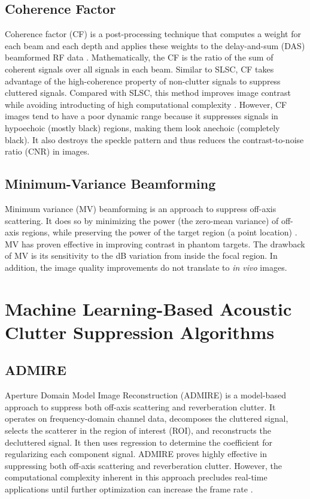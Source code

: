     \subsection{Coherence Factor}
      Coherence factor (CF) is a post-processing technique that computes a weight for each beam and each depth and applies these weights to the delay-and-sum (DAS) beamformed RF data \cite{mallart1994adaptive, hollman1999coherence}. Mathematically, the CF is the ratio of the sum of coherent signals over all signals in each beam. Similar to SLSC, CF takes advantage of the high-coherence property of non-clutter signals to suppress cluttered signals. Compared with SLSC, this method improves image contrast while avoiding introducting of high computational complexity \cite{dei_thesis}. However, CF images tend to have a poor dynamic range because it suppresses signals in hypoechoic (mostly black) regions, making them look anechoic (completely black). It also destroys the speckle pattern and thus reduces the contrast-to-noise ratio (CNR) in images.

    \subsection{Minimum-Variance Beamforming}
      Minimum variance (MV) beamforming is an approach to suppress off-axis scattering. It does so by minimizing the power (the zero-mean variance) of off-axis regions, while preserving the power of the target region (a point location) \cite{synnevag2007adaptive, holfort2009broadband}. MV has proven effective in improving contrast in phantom targets. The drawback of MV is its sensitivity to the dB variation from inside the focal region. In addition, the image quality improvements do not translate to \textit{in vivo} images. %

  \section{Machine Learning-Based Acoustic Clutter Suppression Algorithms}
    \subsection{ADMIRE}

      Aperture Domain Model Image Reconstruction (ADMIRE) is a model-based approach to suppress both off-axis scattering and reverberation clutter. It operates on frequency-domain channel data, decomposes the cluttered signal, selects the scatterer in the region of interest (ROI), and reconstructs the decluttered signal. It then uses regression to determine the coefficient for regularizing each component signal. ADMIRE proves highly effective in suppressing both off-axis scattering and reverberation clutter. However, the computational complexity inherent in this approach precludes real-time applications until further optimization can increase the frame rate \cite{dei_thesis, admire2015}.

